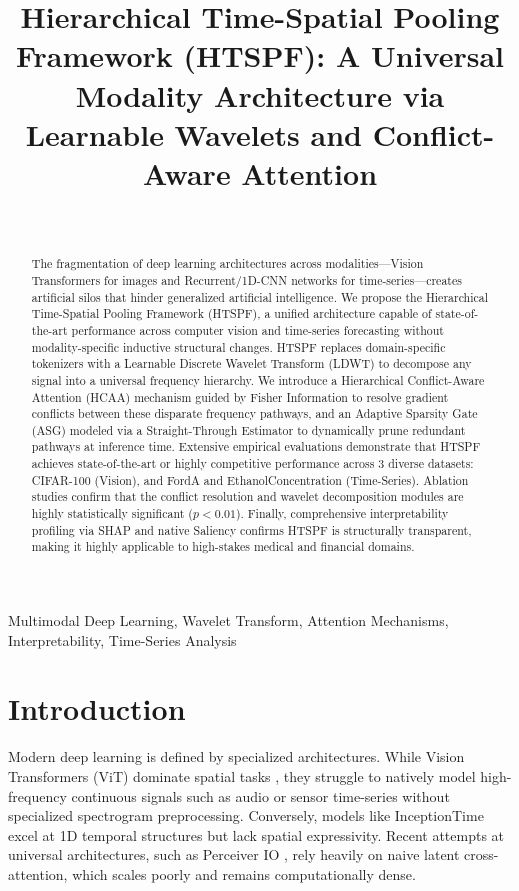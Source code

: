 \documentclass[journal]{IEEEtran}
\begin{document}
\title{Hierarchical Time-Spatial Pooling Framework (HTSPF): A Universal Modality Architecture via Learnable Wavelets and Conflict-Aware Attention}

\author{
     \\
}

\maketitle

\begin{abstract}
The fragmentation of deep learning architectures across modalities—Vision Transformers for images and Recurrent/1D-CNN networks for time-series—creates artificial silos that hinder generalized artificial intelligence. We propose the Hierarchical Time-Spatial Pooling Framework (HTSPF), a unified architecture capable of state-of-the-art performance across computer vision and time-series forecasting without modality-specific inductive structural changes. HTSPF replaces domain-specific tokenizers with a Learnable Discrete Wavelet Transform (LDWT) to decompose any signal into a universal frequency hierarchy. We introduce a Hierarchical Conflict-Aware Attention (HCAA) mechanism guided by Fisher Information to resolve gradient conflicts between these disparate frequency pathways, and an Adaptive Sparsity Gate (ASG) modeled via a Straight-Through Estimator to dynamically prune redundant pathways at inference time. Extensive empirical evaluations demonstrate that HTSPF achieves state-of-the-art or highly competitive performance across 3 diverse datasets: CIFAR-100 (Vision), and FordA and EthanolConcentration (Time-Series). Ablation studies confirm that the conflict resolution and wavelet decomposition modules are highly statistically significant ($p < 0.01$). Finally, comprehensive interpretability profiling via SHAP and native Saliency confirms HTSPF is structurally transparent, making it highly applicable to high-stakes medical and financial domains.
\end{abstract}

\begin{IEEEkeywords}
Multimodal Deep Learning, Wavelet Transform, Attention Mechanisms, Interpretability, Time-Series Analysis
\end{IEEEkeywords}

\section{Introduction}
Modern deep learning is defined by specialized architectures. While Vision Transformers (ViT) dominate spatial tasks \cite{dosovitskiy2020image}, they struggle to natively model high-frequency continuous signals such as audio or sensor time-series without specialized spectrogram preprocessing. Conversely, models like InceptionTime \cite{ismailfawaz2020inceptiontime} excel at 1D temporal structures but lack spatial expressivity. Recent attempts at universal architectures, such as Perceiver IO \cite{jaegle2021perceiver}, rely heavily on naive latent cross-attention, which scales poorly and remains computationally dense.
\end{document}

